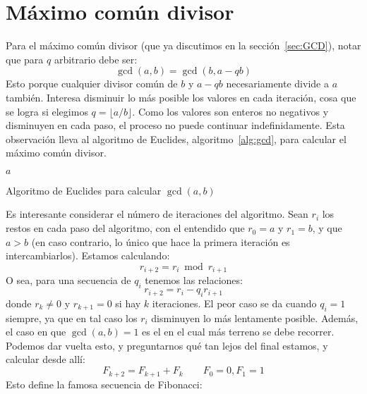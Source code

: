 \section{Máximo común divisor}
\label{sec:gcd}

  Para el máximo común divisor
  (que ya discutimos en la sección~\ref{sec:GCD}),
  notar que para \(q\) arbitrario debe ser:
  \begin{equation*}
    \gcd(a, b) = \gcd(b, a - q b)
  \end{equation*}
  Esto porque cualquier divisor común de \(b\) y \(a - q b\)
  necesariamente divide a \(a\) también.
  Interesa disminuir lo más posible los valores en cada iteración,
  cosa que se logra si elegimos \(q = \lfloor a / b \rfloor\).
  Como los valores son enteros no negativos
  y disminuyen en cada paso,
  el proceso no puede continuar indefinidamente.
  Esta observación lleva al algoritmo de Euclides,
  algoritmo~\ref{alg:gcd},
  para calcular el máximo común divisor.
  \begin{algorithm}[htbp]
    \DontPrintSemicolon

    \KwFunction {} \;
    \BlankLine
    \Return \(a\) \;
    \caption{Algoritmo de Euclides para calcular $\gcd(a, b)$}
    \label{alg:gcd}
  \end{algorithm}
  Es interesante considerar el número de iteraciones del algoritmo.
  Sean \(r_i\) los restos en cada paso del algoritmo,
  con el entendido que \(r_0 = a\) y \(r_1 = b\),
  y que \(a > b\)
  (en caso contrario,
   lo único que hace la primera iteración es intercambiarlos).
  Estamos calculando:
  \begin{equation*}
    r_{i + 2} = r_i \bmod r_{i + 1}
  \end{equation*}
  O sea,
  para una secuencia de \(q_i\)
  tenemos las relaciones:
  \begin{equation*}
    r_{i + 2} = r_i - q_i r_{i + 1}
  \end{equation*}
  donde \(r_k \ne 0\) y \(r_{k + 1} = 0\)
  si hay \(k\) iteraciones.
  El peor caso se da cuando \(q_i = 1\) siempre,
  ya que en tal caso
  los \(r_i\) disminuyen lo más lentamente posible.
  Además,
  el caso en que \(\gcd(a, b) = 1\)
  es el en el cual más terreno se debe recorrer.
  Podemos dar vuelta esto,
  y preguntarnos qué tan lejos del final estamos,
  y calcular desde allí:
  \begin{equation}
    \label{eq:Fibonacci}
    F_{k + 2} = F_{k + 1} + F_k \qquad F_0 = 0, F_1 = 1
  \end{equation}
  Esto define la famosa secuencia de Fibonacci:%

